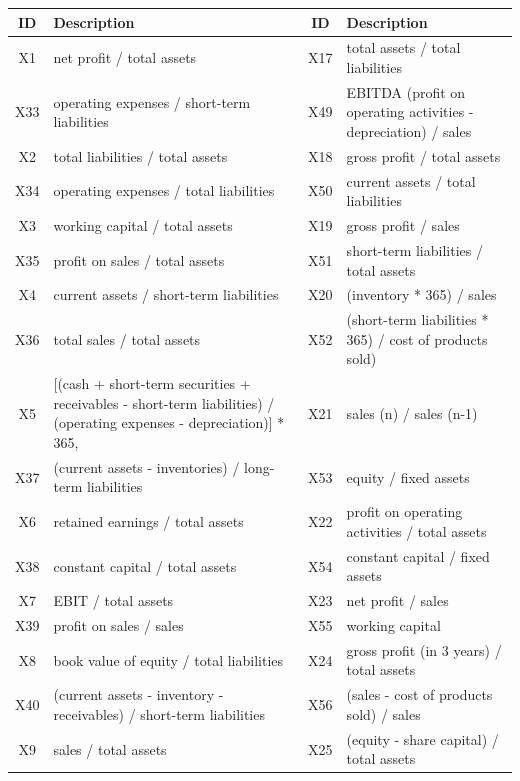 \begin{table}[H]
\centering
\small
\begin{tabular}{|c|p{6cm}|c|p{6cm}|}
\hline
\textbf{ID} & \textbf{Description} & \textbf{ID} & \textbf{Description} \\
\hline
X1 & net profit / total assets & X17 & total assets / total liabilities \\
\hline
X33 & operating expenses / short-term liabilities & X49 & EBITDA (profit on operating activities - depreciation) / sales \\
\hline
X2 & total liabilities / total assets & X18 & gross profit / total assets \\
\hline
X34 & operating expenses / total liabilities & X50 & current assets / total liabilities \\
\hline
X3 & working capital / total assets & X19 & gross profit / sales \\
\hline
X35 & profit on sales / total assets & X51 & short-term liabilities / total assets \\
\hline
X4 & current assets / short-term liabilities & X20 & (inventory * 365) / sales \\
\hline
X36 & total sales / total assets & X52 & (short-term liabilities * 365) / cost of products sold) \\
\hline
X5 & [(cash + short-term securities + receivables - short-term liabilities) / (operating expenses - depreciation)] * 365, & X21 & sales (n) / sales (n-1) \\
\hline
X37 & (current assets - inventories) / long-term liabilities & X53 & equity / fixed assets \\
\hline
X6 & retained earnings / total assets & X22 & profit on operating activities / total assets \\
\hline
X38 & constant capital / total assets & X54 & constant capital / fixed assets \\
\hline
X7 & EBIT / total assets & X23 & net profit / sales \\
\hline
X39 & profit on sales / sales & X55 & working capital \\
\hline
X8 & book value of equity / total liabilities & X24 & gross profit (in 3 years) / total assets \\
\hline
X40 & (current assets - inventory - receivables) / short-term liabilities & X56 & (sales - cost of products sold) / sales \\
\hline
X9 & sales / total assets & X25 & (equity - share capital) / total assets \\

\end{tabular}
\end{table}

